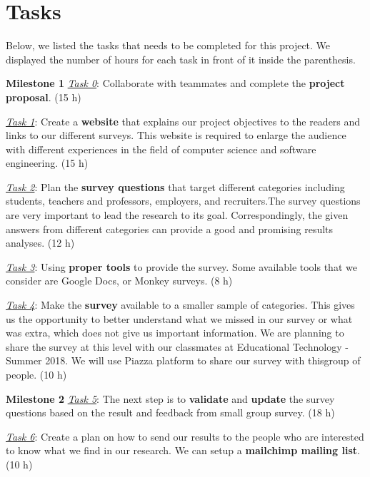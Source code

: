 \documentclass{sigchi}
\begin{document}
   
  \section{Tasks}
  Below, we listed the tasks that needs to be completed for this project. We displayed the number of hours for each task in front of it inside the parenthesis.\newline

\textbf{Milestone 1}\newline
\textit{\underline{Task 0}}: Collaborate with teammates and complete the \textbf{project proposal}. (15 h)

\textit{\underline{Task 1}}: Create a \textbf{website} that explains our project objectives to the readers and links to our different surveys. This website is required to enlarge the audience with different  experiences in the field of computer science and software engineering. (15 h)

\textit{\underline{Task 2}}: Plan the \textbf{survey questions} that target different categories including students, teachers and professors, employers, and recruiters.The survey questions are very important to lead the research to its goal. Correspondingly, the given answers from different categories can provide a good and promising results analyses. (12 h)

\textit{\underline{Task 3}}: Using \textbf{proper tools} to provide the survey. Some available tools that we consider are Google Docs, or Monkey surveys. (8 h)

\textit{\underline{Task 4}}: Make the \textbf{survey} available to a smaller sample of categories. This gives us the opportunity to better understand what we missed in our survey or what was extra, which does not give us important information. We are planning to share the survey at this level with our classmates at Educational Technology - Summer 2018. We will use Piazza platform to share our survey with thisgroup of people. (10 h)\newline

\textbf{Milestone 2}\newline
\textit{\underline{Task 5}}: The next step is to \textbf{validate} and \textbf{update} the survey questions based on the result and feedback from small group survey. (18 h)

\textit{\underline{Task 6}}: Create a plan on how to send our results to the people who are interested to know what we find in our research. We can setup a \textbf{mailchimp mailing list}. (10 h)
\end{document}
